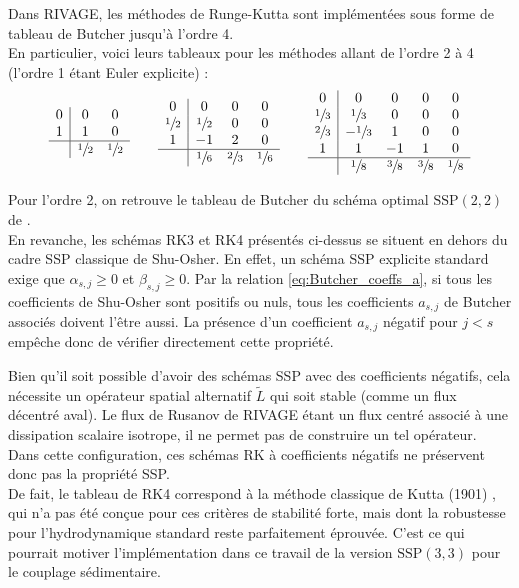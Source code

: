 \documentclass[11pt, a4paper, oneside]{report}
\begin{document}
Dans RIVAGE, les méthodes de Runge-Kutta sont implémentées sous forme de tableau de Butcher jusqu'à l'ordre 4. \\
En particulier, voici leurs tableaux pour les méthodes allant de l'ordre 2 à 4 (l'ordre 1 étant Euler explicite) :
\begin{equation}
    \begin{array}{c|cc}
        0 & 0 & 0 \\
        1 & 1 & 0 \\
        \hline
        & \sfrac{1}{2} & \sfrac{1}{2}
    \end{array}
    \qquad
    \begin{array}{c|ccc}
        0 & 0 & 0 & 0 \\
        \sfrac{1}{2} & \sfrac{1}{2} & 0 & 0 \\
        1 & -1 & 2 & 0 \\
        \hline
        & \sfrac{1}{6} & \sfrac{2}{3} & \sfrac{1}{6}
    \end{array}
    \qquad
    \begin{array}{c|cccc}
        0 & 0 & 0 & 0 & 0 \\
        \sfrac{1}{3} & \sfrac{1}{3} & 0 & 0 & 0 \\
        \sfrac{2}{3} & -\sfrac{1}{3} & 1 & 0 & 0 \\
        1 & 1 & -1 & 1 & 0 \\
        \hline
        & \sfrac{1}{8} & \sfrac{3}{8} & \sfrac{3}{8} & \sfrac{1}{8}
    \end{array}
\end{equation}

Pour l'ordre 2, on retrouve le tableau de Butcher du schéma optimal $\text{SSP}(2, 2)$ de \cite{spiteri2002new}. \\
En revanche, les schémas RK3 et RK4 présentés ci-dessus se situent en dehors du cadre SSP classique de Shu-Osher. En effet, un schéma SSP explicite standard exige que $\alpha_{s, j} \geq 0$ et $\beta_{s, j} \geq 0$. Par la relation \eqref{eq:Butcher_coeffs_a}, si tous les coefficients de Shu-Osher sont positifs ou nuls, tous les coefficients $a_{s, j}$ de Butcher associés doivent l'être aussi. La présence d'un coefficient $a_{s, j}$ négatif pour $j < s$ empêche donc de vérifier directement cette propriété.

Bien qu'il soit possible d'avoir des schémas SSP avec des coefficients négatifs, cela nécessite un opérateur spatial alternatif $\widetilde{L}$ qui soit stable (comme un flux décentré aval). Le flux de Rusanov de RIVAGE étant un flux centré associé à une dissipation scalaire isotrope, il ne permet pas de construire un tel opérateur. Dans cette configuration, ces schémas RK à coefficients négatifs ne préservent donc pas la propriété SSP. \\
De fait, le tableau de RK4 correspond à la méthode classique de Kutta (1901) \cite{butcher1996runge}, qui n'a pas été conçue pour ces critères de stabilité forte, mais dont la robustesse pour l'hydrodynamique standard reste parfaitement éprouvée. C'est ce qui pourrait motiver l'implémentation dans ce travail de la version $\text{SSP}(3,3)$ pour le couplage sédimentaire.
\end{document}
